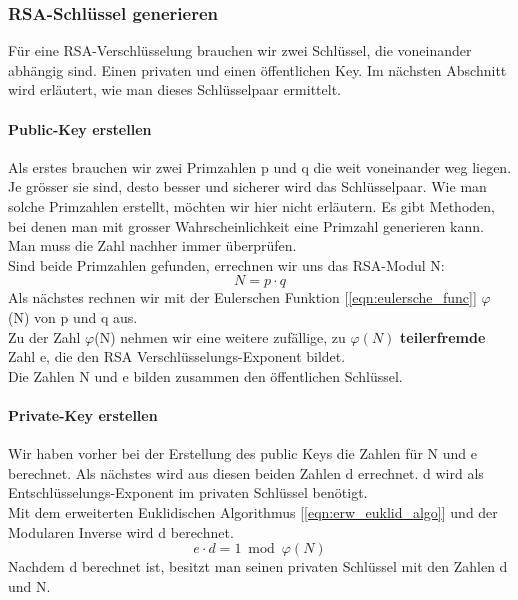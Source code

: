 \subsubsection{RSA-Schlüssel generieren}
Für eine RSA-Verschlüsselung brauchen wir zwei Schlüssel, die voneinander abhängig sind. Einen privaten und einen öffentlichen Key. Im nächsten Abschnitt wird erläutert, wie man dieses Schlüsselpaar ermittelt.%
%
\paragraph{Public-Key erstellen}\label{sec:public_key}
Als erstes brauchen wir zwei Primzahlen p und q die weit voneinander weg liegen. Je grösser sie sind, desto besser und sicherer wird das Schlüsselpaar. Wie man solche Primzahlen erstellt, möchten wir hier nicht erläutern. Es gibt Methoden, bei denen man mit grosser Wahrscheinlichkeit eine Primzahl generieren kann. Man muss die Zahl nachher immer überprüfen.\\
Sind beide Primzahlen gefunden, errechnen wir uns das RSA-Modul N: %
%
\begin{equation}
  N = p \cdot q
  \label{eqn:rsa_modul}
\end{equation}
%
Als nächstes rechnen wir mit der Eulerschen Funktion [\ref{eqn:eulersche_func}] $\varphi$(N) von p und q aus.\\
Zu der Zahl $\varphi$(N) nehmen wir eine weitere zufällige, zu $\varphi(N)$ \textbf{teilerfremde} Zahl e, die den RSA Verschlüsselungs-Exponent bildet.\\
Die Zahlen N und e bilden zusammen den öffentlichen Schlüssel.
\paragraph{Private-Key erstellen}
Wir haben vorher bei der Erstellung des public Keys die Zahlen für N und e berechnet. Als nächstes wird aus diesen beiden Zahlen d errechnet. d wird als Entschlüsselungs-Exponent im privaten Schlüssel benötigt.\\
Mit dem erweiterten Euklidischen Algorithmus [\ref{eqn:erw_euklid_algo}] und der Modularen Inverse wird d berechnet.\\
\begin{equation}
	e \cdot d = 1 \bmod{ \varphi(N) } 
	\label{eqn:rsa_private_key_erstellen}
\end{equation}
%
%
%
Nachdem d berechnet ist, besitzt man seinen privaten Schlüssel mit den Zahlen d und N.
